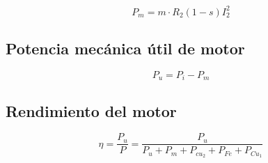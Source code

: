 \documentclass[../main]{subfiles}
\begin{document}
\begin{equation}
    P_m=m \cdot R_2 (1-s) I_2^2
\end{equation}

\subsection{Potencia mecánica útil de motor}
\begin{equation}
P_u=P_i-P_m    
\end{equation}

\subsection{Rendimiento del motor}
\begin{equation}
    \eta = \dfrac{P_u}{P}=\dfrac{P_u}{P_u+P_m+P_{cu_2}+P_{Fe}+P_{Cu_1}}
\end{equation}
\end{document}
